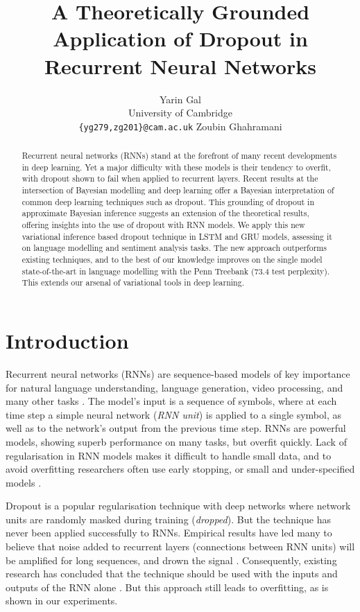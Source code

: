 \documentclass{article}
\title{A Theoretically Grounded Application of Dropout in Recurrent Neural Networks}
\author{
\And
Yarin Gal 
\And
\\
University of Cambridge\\
\texttt{\{yg279,zg201\}@cam.ac.uk} 
\And
Zoubin Ghahramani
}
\theoremstyle{definition}
\begin{document}
 


\maketitle

\begin{abstract}
Recurrent neural networks (RNNs) stand at the forefront of many recent developments in deep learning. Yet a major difficulty with these models is their tendency to overfit, with dropout shown to fail when applied to recurrent layers. 
Recent results at the intersection of Bayesian modelling and deep learning offer a Bayesian interpretation of common deep learning techniques such as dropout.
This grounding of dropout in approximate Bayesian inference suggests an extension of the theoretical results, offering insights into the use of dropout with RNN models.
We apply this new variational inference based dropout technique in LSTM and GRU models, assessing it on language modelling and sentiment analysis tasks. The new approach outperforms existing techniques, and to the best of our knowledge improves on the single model state-of-the-art in language modelling with the Penn Treebank (73.4 test perplexity).
This extends our arsenal of variational tools in deep learning.
\end{abstract} 

\section{Introduction}

Recurrent neural networks (RNNs) are sequence-based models of key importance for natural language understanding, language generation, video processing, and many other tasks \citep{sundermeyer2012lstm,
kalchbrenner2013recurrent,
sutskever2014sequence}. 
The model's input is a sequence of symbols, where at each time step a simple neural network (\textit{RNN unit}) is applied to a single symbol, as well as to the network's output from the previous time step.
RNNs are powerful models, showing superb performance on many tasks, but overfit quickly. Lack of regularisation in RNN models makes it difficult to handle small data, and to avoid overfitting researchers often use early stopping, or small and under-specified models \citep{zaremba2014recurrent}.

Dropout is a popular regularisation technique with  deep networks \citep{hinton2012improving,
srivastava2014dropout} where network units are randomly masked during training (\textit{dropped}).
But the technique has never been applied successfully to RNNs. 
Empirical results have led many to believe that noise added to recurrent layers (connections between RNN units) will be amplified for long sequences, and drown the signal \citep{zaremba2014recurrent}. 
Consequently, existing research has concluded that the technique should be used with the inputs and outputs of the RNN alone \citep{zaremba2014recurrent,
pachitariu2013regularization,
bayer2013fast,
pham2014dropout,
bluche2015apply}. But this approach still leads to overfitting, as is shown in our experiments. 
\end{document}
